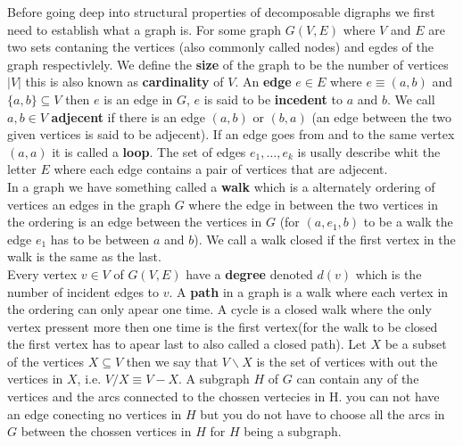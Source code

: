 Before going deep into structural properties of decomposable digraphs we first need to establish what a graph is.
For some graph $G(V,E)$ where $V$ and $E$ are two sets contaning the vertices (also commonly called nodes) and egdes of the graph respectivlely.
We define the \textbf{size} of the graph to be the number of vertices $|V|$ this is also known as \textbf{cardinality} of $V$.
An \textbf{edge} $e \in E$ where $e \equiv (a, b)$ and $\{ a, b \} \subseteq V$ then $e$ is an edge in $G$, $e$ is said to be \textbf{incedent} to $a$ and $b$. 
We call $a,b \in V$ \textbf{adjecent} if there is an edge $(a,b)$ or $(b,a)$ (an edge between the two given vertices is said to be adjecent).
If an edge goes from and to the same vertex $(a,a)$ it is called a \textbf{loop}.
The set of edges $e_1, \dots, e_k$ is usally describe whit the letter $E$ where each edge contains a pair of vertices that are adjecent. \\
In a graph we have something called a \textbf{walk} which is a alternately ordering of vertices an edges in the graph $G$ where the edge in between the two vertices in the ordering is an edge between the vertices in $G$ (for $(a,e_1,b)$ to be a walk the edge $e_1$ has to be between $a$ and $b$).
We call a walk closed if the first vertex in the walk is the same as the last.\\
Every vertex $v\in V$ of $G(V,E)$ have a \textbf{degree} denoted $d(v)$ which is the number of incident edges to $v$.
A \textbf{path} in a graph is a walk where each vertex in the ordering can only apear one time. A cycle is a closed walk where the only vertex pressent more then one time is the first vertex(for the walk to be closed the first vertex has to apear last to also called a closed path).
Let $X$ be a subset of the vertices $X\subseteq V$ then we say that $V\backslash X$ is the set of vertices with out the vertices in $X$, i.e. $V/X \equiv V-X$. 
A subgraph $H$ of $G$ can contain any of the vertices and the arcs connected to the chossen vertecies in H. you can not have an edge conecting no vertices in $H$ but you do not have to choose all the arcs in $G$ between the chossen vertices in $H$ for $H$ being a subgraph. 
